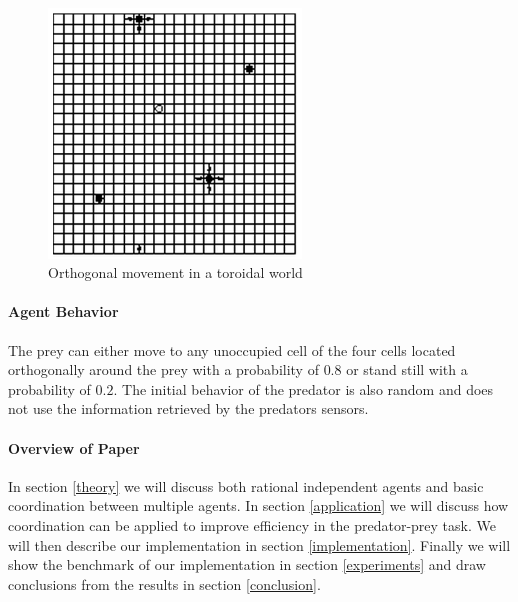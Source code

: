 \documentclass[10pt]{article}
\begin{document}
\begin{figure}[h!tb]
\centering
\includegraphics[width=0.6\textwidth]{img/toroidal}
\caption{Orthogonal movement in a toroidal world}
\label{fig_torwor}
\end{figure}

\paragraph{Agent Behavior}
The prey can either move to any unoccupied cell of the four cells located orthogonally around the prey with a probability of $0.8$ or stand still with a probability of $0.2$. The initial behavior of the predator is also random and does not use the information retrieved by the predators sensors.

\paragraph{Overview of Paper}
In section \ref{theory} we will discuss both rational independent agents and basic coordination between multiple agents. In section \ref{application} we will discuss how coordination can be applied to improve efficiency in the predator-prey task. We will then describe our implementation in section \ref{implementation}. Finally we will show the benchmark of our implementation in section \ref{experiments} and draw conclusions from the results in section \ref{conclusion}.
\end{document}
